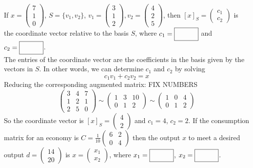    \fi        
\fi 
\ifnum {} %
    If $x = \begin{pmatrix} 7\\1\\0\end{pmatrix}$, $S=\{v_1,v_2\}$, $v_1=\begin{pmatrix} 3\\1\\2\end{pmatrix}, v_2 = \begin{pmatrix} 4\\2\\5\end{pmatrix}$, then $[x]_S = \begin{pmatrix} c_1\\c_2\end{pmatrix}$ is the coordinate vector relative to the basis $S$, where $c_1 = \framebox{\strut\hspace{1cm}}$ and $c_2 = \framebox{\strut\hspace{1cm}}$. 
    \ifnum {} {\color{DarkBlue} \\[12pt] The entries of the coordinate vector are the coefficients in the basis given by the vectors in $S$. In other words, we can determine $c_1$ and $c_2$ by solving 
    $$c_1v_1 + c_2v_2 = x$$
    Reducing the corresponding augmented matrix: FIX NUMBERS
    $$\begin{pmatrix} 3&4&7\\1&2&1\\2&5&0\end{pmatrix} 
    \sim \begin{pmatrix} 1&3&10\\0&1&2\end{pmatrix}
    \sim \begin{pmatrix} 1&0&4\\0&1&2\end{pmatrix}$$
    So the coordinate vector is $[x]_S = \begin{pmatrix} 4\\2\end{pmatrix}$ and $c_1 = 4$, $c_2 = 2$. 
    } 
    \fi
\fi 
\ifnum {} %
    If the consumption matrix for an economy is $C=\frac{1}{10}\begin{pmatrix} 6&2\\0&4\end{pmatrix}$ then the output $x$ to meet a desired output $d=\begin{pmatrix} 14\\20\end{pmatrix}$ is $x=\begin{pmatrix} x_1\\x_2 \end{pmatrix}$, where $x_1 = \framebox{\strut\hspace{1.0cm}}$, $x_2 = \framebox{\strut\hspace{1.0cm}}$.

